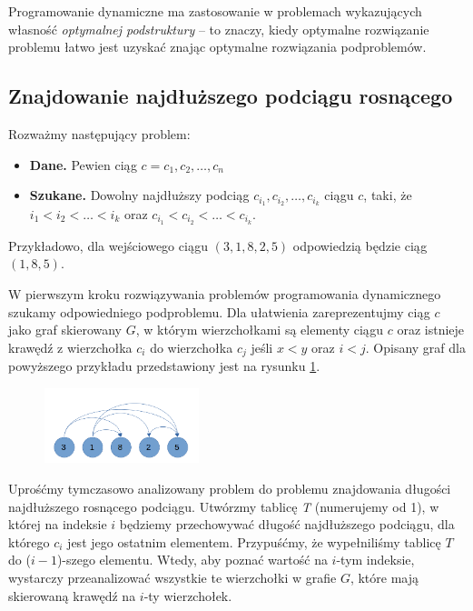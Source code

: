 Programowanie dynamiczne ma zastosowanie w problemach wykazujących 
własność \emph{optymalnej podstruktury} –
to znaczy, kiedy optymalne rozwiązanie problemu 
łatwo jest uzyskać znając optymalne rozwiązania podproblemów. 

\subsection{Znajdowanie najdłuższego podciągu rosnącego}
Rozważmy następujący problem: 
\begin{itemize}
	\item[] \textbf{Dane.} Pewien ciąg $c = c_1,c_2, \ldots, c_n$
	\item[] \textbf{Szukane.} Dowolny najdłuższy podciąg 
	$c_{i_1},c_{i_2},\ldots, c_{i_k}$ ciągu $c$, taki, że
	$i_1 < i_2 < \ldots < i_k$ oraz $c_{i_1} < c_{i_2} < \ldots < c_{i_k}$.    
\end{itemize}

Przykładowo, dla wejściowego ciągu $(3, 1, 8, 2, 5)$ odpowiedzią będzie
ciąg $(1, 8, 5)$.

W pierwszym kroku rozwiązywania problemów programowania dynamicznego szukamy
odpowiedniego podproblemu. Dla ułatwienia zareprezentujmy ciąg $c$ jako 
graf skierowany $G$, w którym wierzchołkami są elementy ciągu $c$ oraz 
istnieje krawędź z wierzchołka $c_i$ do wierzchołka $c_j$ jeśli $x < y$
oraz $i < j$. 
Opisany graf dla powyższego przykładu przedstawiony jest na rysunku
\ref{fig:example111_max_length}.

\begin{figure}[H]
	\centering
	\includegraphics[width=0.4\textwidth]{data/prblm1_ex_graph.png}
	\caption{ }
	\label{fig:example111_max_length}
\end{figure}

Uprośćmy tymczasowo analizowany problem do problemu znajdowania 
długości najdłuższego rosnącego podciągu. Utwórzmy tablicę \textit{T} 
(numerujemy od 1), w której na indeksie $i$ 
będziemy przechowywać długość najdłuższego podciągu, dla którego $c_i$
jest jego ostatnim elementem. Przypuśćmy, że wypełniliśmy tablicę 
$T$ do ($i-1$)-szego elementu.
Wtedy, aby poznać wartość na $i$-tym indeksie, wystarczy przeanalizować 
wszystkie te wierzchołki w grafie $G$, które mają skierowaną krawędź na
$i$-ty wierzchołek.

